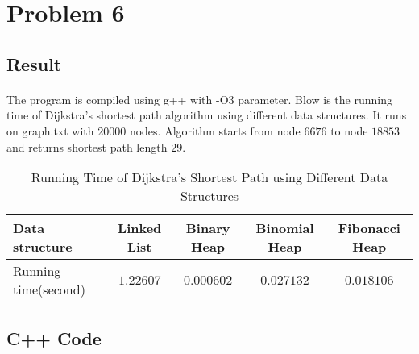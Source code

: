 \documentclass[]{article}
\begin{document}
    \section{Problem 6}
        \subsection{Result}
            \paragraph{} The program is compiled using g++ with -O3 parameter. Blow is the running time of Dijkstra's shortest path algorithm using different data structures. It runs on graph.txt with $20000$ nodes. Algorithm starts from node $6676$ to node $18853$ and returns shortest path length $29$.
            \begin{table}[h!]
            \centering
            \caption{Running Time of Dijkstra's Shortest Path using Different Data Structures}
            
            \begin{tabular}{l|*{4}{c}}
            \hline
Data structure & Linked List & Binary Heap & Binomial Heap & Fibonacci Heap \\
\hline
Running time(second) & $1.22607$ & $0.000602$ & $0.027132$ & $0.018106$ \\
            \hline            
            \end{tabular}
            \end{table}
        \subsection{C++ Code}
            
    
    
\end{document}
